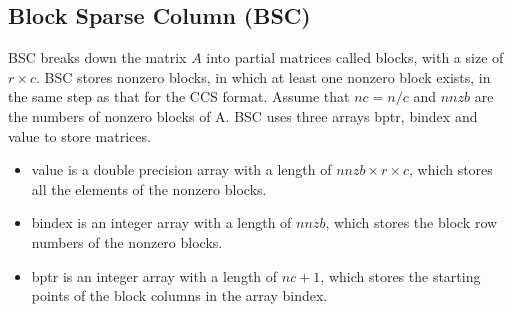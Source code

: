 \documentclass[a4paper]{article}
\begin{document}
\newpage
\subsection{Block Sparse Column (BSC)}
BSC breaks down the matrix $A$ into partial matrices called blocks, with a
size of $r \times c$. BSC stores nonzero blocks, in which at
least one nonzero block exists, in the same step as that for the CCS
format. Assume that $nc=n/c$ and $nnzb$ are the numbers of nonzero
blocks of A. BSC uses three arrays {\ttfamily bptr}, {\ttfamily bindex}
and {\ttfamily value} to store matrices. 
\begin{itemize}
\item {\ttfamily value} is a double precision array with a length of
      $nnzb \times r \times c$, which stores all the elements of the nonzero blocks.
\item {\ttfamily bindex} is an integer array with a length of $nnzb$,
      which stores the block row numbers of the nonzero blocks.
\item {\ttfamily bptr} is an integer array with a length of $nc+1$,
      which stores the starting points of the block columns in the array
      {\ttfamily bindex}.
\end{itemize}
\end{document}
